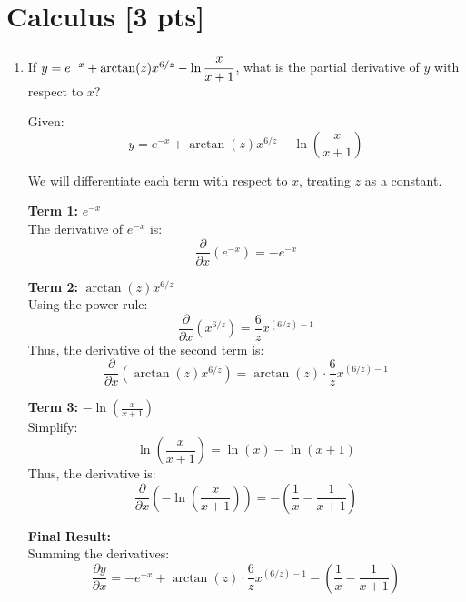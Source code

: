 \documentclass[letter]{article}
\theoremstyle{definition}
\newenvironment{soln}{
	\leavevmode\color{black}\ignorespaces
}{}
\begin{document}
 \pagebreak
	
	\section{Calculus [3 pts]}
	\begin{enumerate}
		\item If $y = e^{-x} + \arctan(z)x^{6/z} - \ln\cfrac{x}{x+1}$, what is the partial derivative of $y$ with respect to $x$?\\
		\begin{soln}
        
        
        Given:
        \[
        y = e^{-x} + \arctan(z)x^{6/z} - \ln\left(\frac{x}{x+1}\right)
        \]
        
        We will differentiate each term with respect to $x$, treating $z$ as a constant.
        
        \textbf{Term 1:} $e^{-x}$\\
        The derivative of $e^{-x}$ is:
        \[
        \frac{\partial}{\partial x} \left( e^{-x} \right) = -e^{-x}
        \]
        
        \textbf{Term 2:} $\arctan(z)x^{6/z}$\\
        Using the power rule:
        \[
        \frac{\partial}{\partial x} \left( x^{6/z} \right) = \frac{6}{z} x^{(6/z) - 1}
        \]
        Thus, the derivative of the second term is:
        \[
        \frac{\partial}{\partial x} \left( \arctan(z) x^{6/z} \right) = \arctan(z) \cdot \frac{6}{z} x^{(6/z) - 1}
        \]
        
        \textbf{Term 3:} $-\ln\left(\frac{x}{x+1}\right)$\\
        Simplify:
        \[
        \ln\left(\frac{x}{x+1}\right) = \ln(x) - \ln(x+1)
        \]
        Thus, the derivative is:
        \[
        \frac{\partial}{\partial x} \left( - \ln\left(\frac{x}{x+1}\right) \right) = -\left( \frac{1}{x} - \frac{1}{x+1} \right)
        \]
        
        \textbf{Final Result:}\\
        Summing the derivatives:
        \[
        \frac{\partial y}{\partial x} = -e^{-x} + \arctan(z) \cdot \frac{6}{z} x^{(6/z) - 1} - \left( \frac{1}{x} - \frac{1}{x+1} \right)
        \]
        \end{soln}
	\end{enumerate}
	
	
\pagebreak	
	
\end{document}
